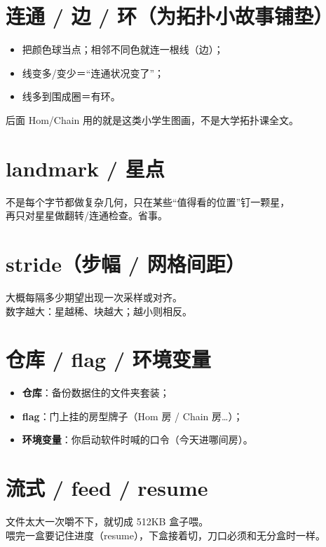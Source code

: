 \section{连通 / 边 / 环（为拓扑小故事铺垫）}

\begin{itemize}[nosep]
  \item 把颜色球当点；相邻不同色就连一根线（边）；
  \item 线变多/变少＝``连通状况变了''；
  \item 线多到围成圈＝有环。
\end{itemize}
后面 Hom/Chain 用的就是这类小学生图画，不是大学拓扑课全文。

\section{landmark / 星点}

\begin{metaphor}[采样点]
不是每个字节都做复杂几何，只在某些``值得看的位置''钉一颗星，\\
再只对星星做翻转/连通检查。省事。
\end{metaphor}

\section{stride（步幅 / 网格间距）}

大概每隔多少期望出现一次采样或对齐。\\
数字越大：星越稀、块越大；越小则相反。

\section{仓库 / flag / 环境变量}

\begin{itemize}[nosep]
  \item \textbf{仓库}：备份数据住的文件夹套装；
  \item \textbf{flag}：门上挂的房型牌子（Hom 房 / Chain 房…）；
  \item \textbf{环境变量}：你启动软件时喊的口令（今天进哪间房）。
\end{itemize}

\section{流式 / feed / resume}

文件太大一次嚼不下，就切成 512KB 盒子喂。\\
喂完一盒要记住进度（resume），下盒接着切，刀口必须和无分盒时一样。
